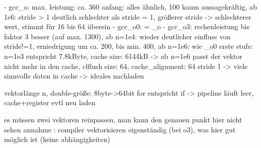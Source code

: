 - gcc_o:	max. leistung: ca. 360
		anfang: alles ähnlich, 100 kaum aussagekräftig, ab 1e6: stride > 1 deutlich schlechter als stride = 1, größerer stride -> schlechterer wert, stimmt für 16 bis 64 überein
- gcc_o0:	= _o
- gcc_o3:	rechenleistung bis faktor 3 besser (auf max. 1300), ab n=1e4: wieder deutlicher einfluss von stride!=1, erniedrigung 
		um ca. 200, bis min. 400, ab n=1e6: wie _o0
		erste stufe: n=1e3 entspricht 7.8kByte, cache size: 6144kB -> ab n=1e6 passt der vektor nicht mehr in den cache, clflush size: 64, cache_alignment: 64
		stride 1 -> viele sinnvolle daten in cache -> ideales nachladen








vektorlänge n, double-größe: 8byte->64bit
for entspricht if -> pipeline läuft leer, cache+register evtl neu laden

es müssen zwei vektoren reinpassen, man kann den genauen punkt hier nicht sehen
annahme : compiler vektorisieren eigenständig (bei o3), was hier gut möglich ist (keine abhängigkeiten)